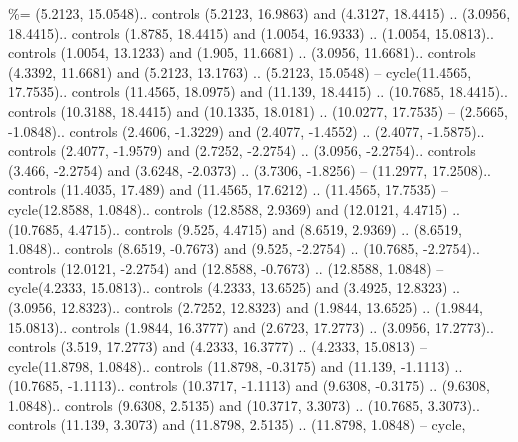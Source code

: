 \%= {(5.2123, 15.0548).. controls (5.2123, 16.9863) and (4.3127, 18.4415) .. (3.0956, 18.4415).. controls (1.8785, 18.4415) and (1.0054, 16.9333) .. (1.0054, 15.0813).. controls (1.0054, 13.1233) and (1.905, 11.6681) .. (3.0956, 11.6681).. controls (4.3392, 11.6681) and (5.2123, 13.1763) .. (5.2123, 15.0548) -- cycle(11.4565, 17.7535).. controls (11.4565, 18.0975) and (11.139, 18.4415) .. (10.7685, 18.4415).. controls (10.3188, 18.4415) and (10.1335, 18.0181) .. (10.0277, 17.7535) -- (2.5665, -1.0848).. controls (2.4606, -1.3229) and (2.4077, -1.4552) .. (2.4077, -1.5875).. controls (2.4077, -1.9579) and (2.7252, -2.2754) .. (3.0956, -2.2754).. controls (3.466, -2.2754) and (3.6248, -2.0373) .. (3.7306, -1.8256) -- (11.2977, 17.2508).. controls (11.4035, 17.489) and (11.4565, 17.6212) .. (11.4565, 17.7535) -- cycle(12.8588, 1.0848).. controls (12.8588, 2.9369) and (12.0121, 4.4715) .. (10.7685, 4.4715).. controls (9.525, 4.4715) and (8.6519, 2.9369) .. (8.6519, 1.0848).. controls (8.6519, -0.7673) and (9.525, -2.2754) .. (10.7685, -2.2754).. controls (12.0121, -2.2754) and (12.8588, -0.7673) .. (12.8588, 1.0848) -- cycle(4.2333, 15.0813).. controls (4.2333, 13.6525) and (3.4925, 12.8323) .. (3.0956, 12.8323).. controls (2.7252, 12.8323) and (1.9844, 13.6525) .. (1.9844, 15.0813).. controls (1.9844, 16.3777) and (2.6723, 17.2773) .. (3.0956, 17.2773).. controls (3.519, 17.2773) and (4.2333, 16.3777) .. (4.2333, 15.0813) -- cycle(11.8798, 1.0848).. controls (11.8798, -0.3175) and (11.139, -1.1113) .. (10.7685, -1.1113).. controls (10.3717, -1.1113) and (9.6308, -0.3175) .. (9.6308, 1.0848).. controls (9.6308, 2.5135) and (10.3717, 3.3073) .. (10.7685, 3.3073).. controls (11.139, 3.3073) and (11.8798, 2.5135) .. (11.8798, 1.0848) -- cycle},

